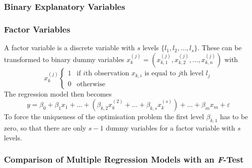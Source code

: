 \documentclass[11pt]{article}
\theoremstyle{definition}
\begin{document}
\subsubsection{Binary Explanatory Variables}

\subsubsection{Factor Variables}
A factor variable is a discrete variable with $s$ levels $\{l_1, l_2,\dots,l_s\}$. These can be transformed to binary dummy variables $x_k^{(j)} = (x_{k,1}^{(j)}, x_{k,2}^{(j)}, \dots, x_{k,n}^{(j)})$ with
\begin{equation*}
	x_k^{(j)} \left\{
		\begin{matrix}
			1 & \text{if $i$th observation $x_{k,i}$ is equal to $j$th level $l_j$}\\
			0 & \text{otherwise}
		\end{matrix}
	\right.
\end{equation*}
The regression model then becomes
\begin{equation*}
	y = \beta_0 + \beta_1x_1 + \dots + (\beta_{k,2}x_k^{(2)} + \dots + \beta_{k,s}x_k^{(s)}) + \dots + \beta_m x_m + \varepsilon
\end{equation*}
To force the uniqueness of the optimisation problem the first level $\beta_{k,1}$ has to be zero, so that there are only $s-1$ dummy variables for a factor variable with $s$ levels.

\subsubsection{Comparison of Multiple Regression Models with an \textit{F}-Test}
\end{document}
